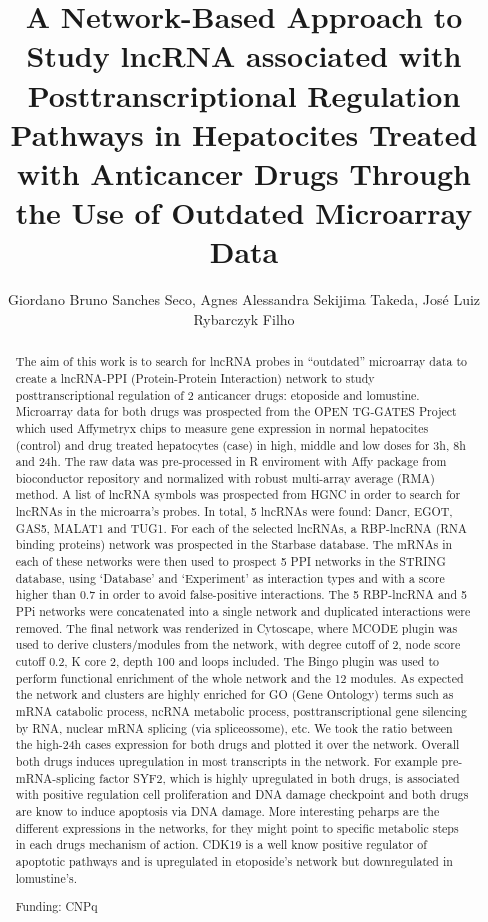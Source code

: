 \documentclass[twoside]{article}
\title{\vspace{-15mm}\fontsize{24pt}{10pt}\selectfont\textbf{ A Network-Based Approach to Study lncRNA associated with Posttranscriptional Regulation Pathways in Hepatocites Treated with Anticancer Drugs Through the Use of Outdated Microarray Data }} %
\author{ Giordano Bruno Sanches Seco, Agnes Alessandra Sekijima Takeda, Jos\'e Luiz Rybarczyk Filho }
\affil{ Instituto de Bioci\^encias de Botucatu - UNESP }
\date{}
\begin{document}
  
  
  \maketitle %
  
  
  \thispagestyle{fancy} %
  
  
  \begin{abstract}
  The aim of this work is to search for lncRNA probes in “outdated” microarray data to create a lncRNA-PPI (Protein-Protein Interaction) network to study posttranscriptional regulation of 2 anticancer drugs: etoposide and lomustine. Microarray data for both drugs was prospected from the OPEN TG-GATES Project which used Affymetryx chips to measure gene expression in normal hepatocites (control) and drug treated hepatocytes (case) in high,  middle and low doses for 3h,  8h and 24h. The raw data was pre-processed in R enviroment with Affy package from bioconductor repository and normalized with robust multi-array average (RMA) method. A list of lncRNA symbols was prospected from HGNC in order to search for lncRNAs in the microarra’s probes. In total,  5 lncRNAs were found: Dancr,  EGOT,  GAS5,  MALAT1 and TUG1. For each of the selected lncRNAs,  a RBP-lncRNA (RNA binding proteins) network was prospected in the Starbase database. The mRNAs in each of these networks were then used to prospect 5 PPI networks in the STRING database,  using ‘Database’ and ‘Experiment’ as interaction types and with a score higher than 0.7 in order to avoid false-positive interactions. The 5 RBP-lncRNA and 5 PPi networks were concatenated into a single network and duplicated interactions were removed. The final network was renderized in Cytoscape,  where MCODE plugin was used to derive clusters/modules from the network,  with degree cutoff of 2,  node score cutoff 0.2,  K core 2,  depth 100 and loops included. The Bingo plugin was used to perform functional enrichment of the whole network and the 12 modules. As expected the network and clusters are highly enriched for GO (Gene Ontology) terms such as mRNA catabolic process,  ncRNA metabolic process,  posttranscriptional gene silencing by RNA,  nuclear mRNA splicing (via spliceossome),  etc. We took the ratio between the high-24h cases expression for both drugs and plotted it over the network. Overall both drugs induces upregulation in most transcripts in the network. For example pre-mRNA-splicing factor SYF2,  which is highly upregulated in both drugs,  is associated with positive regulation cell proliferation and DNA damage checkpoint and both drugs are know to induce apoptosis via DNA  damage. More interesting peharps are the different expressions in the networks,  for they might point to specific metabolic steps in each drugs mechanism of action. CDK19 is a well know positive regulator of apoptotic pathways and is upregulated in etoposide’s network but downregulated in lomustine’s.
  
  Funding: CNPq \\ 
  \end{abstract}
  
\end{document}
